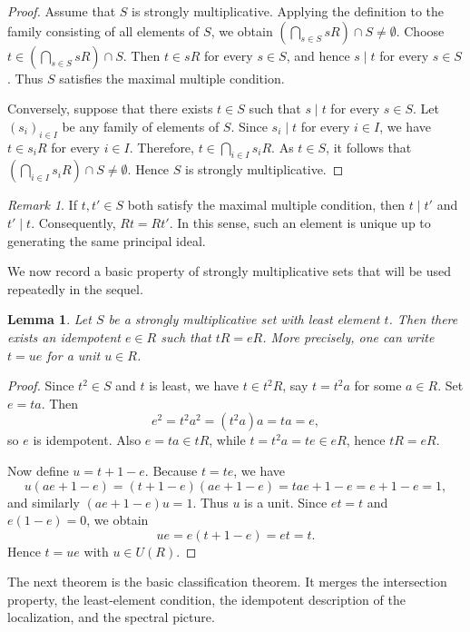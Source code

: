 \documentclass[11pt]{amsart}
\newtheorem{lemma}[theorem]{Lemma}
\theoremstyle{definition}
\theoremstyle{remark}
\newtheorem{remark}[theorem]{Remark}
\begin{document}
\begin{proof}
Assume that $S$ is strongly multiplicative. Applying the definition to the family consisting of all elements of $S$, we obtain $\left( \bigcap_{s \in S} sR \right) \cap S \neq \emptyset.$
Choose $t \in \left( \bigcap_{s \in S} sR \right) \cap S$. Then $t \in sR$ for every $s \in S$, and hence $s \mid t$ for every $s \in S$. Thus $S$ satisfies the maximal multiple condition.

Conversely, suppose that there exists $t \in S$ such that $s \mid t$ for every $s \in S$. Let $(s_i)_{i \in I}$ be any family of elements of $S$. Since $s_i \mid t$ for every $i \in I$, we have $t \in s_iR$ for every $i \in I$. Therefore,
$t \in \bigcap_{i \in I} s_iR.$
As $t \in S$, it follows that $\left( \bigcap_{i \in I} s_iR \right) \cap S \neq \emptyset.$
Hence $S$ is strongly multiplicative.
\end{proof}

\begin{remark}
If $t, t' \in S$ both satisfy the maximal multiple condition, then $t \mid t'$ and $t' \mid t$. Consequently, $Rt = Rt'$. In this sense, such an element is unique up to generating the same principal ideal.
\end{remark}

We now record a basic property of strongly multiplicative sets that will be used repeatedly in the sequel.

\begin{lemma}\label{lem:idempotent}
Let $S$ be a strongly multiplicative set with least element $t$.
Then there exists an idempotent $e \in R$ such that $tR=eR$.
More precisely, one can write $t=ue$ for a unit $u \in R$.
\end{lemma}

\begin{proof}
Since $t^2 \in S$ and $t$ is least, we have $t \in t^2R$, say $t=t^2a$ for some $a \in R$.
Set $e=ta$.
Then
\[
e^2=t^2a^2=(t^2a)a=ta=e,
\]
so $e$ is idempotent.
Also $e=ta \in tR$, while $t=t^2a=te \in eR$, hence $tR=eR$.

Now define $u=t+1-e$.
Because $t=te$, we have
\[
u(ae+1-e)=(t+1-e)(ae+1-e)=tae+1-e=e+1-e=1,
\]
and similarly $(ae+1-e)u=1$.
Thus $u$ is a unit.
Since $et=t$ and $e(1-e)=0$, we obtain
\[
ue=e(t+1-e)=et=t.
\]
Hence $t=ue$ with $u \in U(R)$.
\end{proof}

The next theorem is the basic classification theorem.
It merges the intersection property, the least-element condition, the idempotent description of the localization, and the spectral picture.
\end{document}
